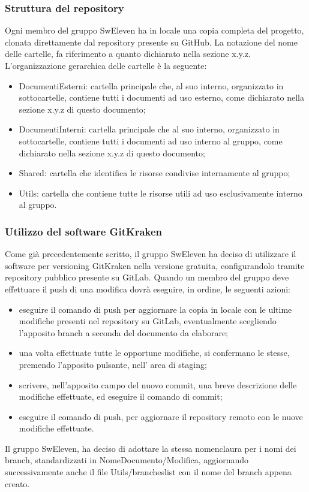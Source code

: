 \subsubsection{Struttura del repository}
Ogni membro del gruppo SwEleven ha in locale una copia completa del progetto, clonata direttamente dal repository presente su GitHub. La notazione del nome delle cartelle, fa riferimento a quanto dichiarato nella sezione x.y.z. L’organizzazione gerarchica delle cartelle è la seguente:
\begin{itemize}
	\item DocumentiEsterni: cartella principale che, al suo interno, organizzato in sottocartelle, contiene tutti i documenti ad uso esterno, come dichiarato nella sezione x.y.z di questo documento;
	\item DocumentiInterni: cartella principale che al suo interno, organizzato in sottocartelle, contiene tutti i documenti ad uso interno al gruppo, come dichiarato nella sezione x.y.z di questo documento;
	\item Shared: cartella che identifica le risorse condivise internamente al gruppo;
	\item Utils: cartella che contiene tutte le risorse utili ad uso esclusivamente interno al gruppo.
\end{itemize}

\subsubsection{Utilizzo del software GitKraken}
Come già precedentemente scritto, il gruppo SwEleven ha deciso di utilizzare il software per versioning GitKraken nella versione gratuita, configurandolo tramite repository pubblico presente su GitLab. Quando un membro del gruppo deve effettuare il push di una modifica dovrà eseguire, in ordine, le seguenti azioni:
\begin{itemize}
	\item eseguire il comando di push per aggiornare la copia in locale con le ultime modifiche presenti nel repository su GitLab, eventualmente scegliendo l’apposito branch a seconda del documento da elaborare;
	\item una volta effettuate tutte le opportune modifiche, si confermano le stesse, premendo l’apposito pulsante, nell’ area di staging;
	\item scrivere, nell’apposito campo del nuovo commit, una breve descrizione delle modifiche effettuate, ed eseguire il comando di commit;
	\item eseguire il comando di push, per aggiornare il repository remoto con le nuove modifiche effettuate.
\end{itemize}
Il gruppo SwEleven, ha deciso di adottare la stessa nomenclaura per i nomi dei branch, standardizzati in NomeDocumento/Modifica, aggiornando successivamente anche il file Utils/brancheslist con il nome del branch appena creato.

